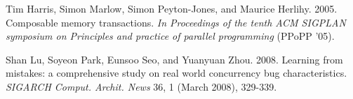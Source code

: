 \documentclass{sigplanconf}
\begin{document}
\begin{thebibliography}{}
  Tim Harris, Simon Marlow, Simon Peyton-Jones, and Maurice
  Herlihy. 2005. Composable memory transactions. \emph{In Proceedings
    of the tenth ACM SIGPLAN symposium on Principles and practice of
    parallel programming} (PPoPP '05).

  Shan Lu, Soyeon Park, Eunsoo Seo, and Yuanyuan Zhou. 2008. Learning
  from mistakes: a comprehensive study on real world concurrency bug
  characteristics. \emph{SIGARCH Comput. Archit. News} 36, 1 (March 2008),
  329-339.



\end{thebibliography}
\end{document}
